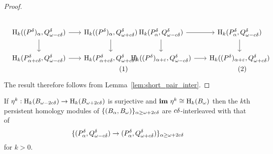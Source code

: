 \begin{proof}
\begin{scriptsize}
  \vspace{3ex}\begin{subequations}
  \begin{minipage}{0.5\textwidth}\begin{equation}\label{dgm:fabgcd}
  \begin{tikzcd}[column sep=scriptsize]
    \hom_k((\P)_\alpha, \Q^\delta)\arrow{r}\arrow{d} &
    \hom_k((\P)_\alpha, \QQ^\delta)\arrow{d}\\
    \hom_k(\P_{\alpha+c\delta}, \Q^\of)\arrow{r}&
    \hom_k(\P_{\alpha+c\delta}, \QQ^\of)
  \end{tikzcd}\end{equation}\end{minipage}
  \begin{minipage}{0.5\textwidth}\begin{equation}\label{dgm:gcdfab}
  \begin{tikzcd}[column sep=scriptsize]
    \hom_k(\P_\alpha, \Q^\of)\arrow{r}\arrow{d} &
    \hom_k(\P_\alpha, \Q^\of)\arrow{d}\\
    \hom_k((\P)_{\alpha+\e}, \Q^\delta)\arrow{r} &
    \hom_k((\P)_{\alpha+\e}, \QQ^\delta)
  \end{tikzcd}\end{equation}\end{minipage}
  \end{subequations}\vspace{3ex}
  \end{scriptsize}

  The result therefore follows from Lemma~\ref{lem:short_pair_inter}.
\end{proof}

\begin{corollary}\label{cor:geo_inter}
  If $\eta^k : \mathrm{H}_k(B_{\omega - 2c{\delta}})\to \mathrm{H}_k(B_{\omega + 2c{\delta}})$ is surjective and $\mathbf{im}~\eta^k\cong \mathrm{H}_k(B_\omega)$ then the $k$th persistent homology modules of
  $\{(B_\alpha, B_\omega)\}_{\alpha\geq\omega + 2c{\delta}}$ are $c{\delta}$-interleaved with that of
  \[\{(P_\alpha^{\delta}, Q_{\omega - c{\delta}}^{\delta})\to (P_\alpha^{\delta}, Q_{\omega + c{\delta}}^{\delta})\}_{\alpha\geq\omega + 2c{\delta}}\]
  for $k > 0$.
\end{corollary}

